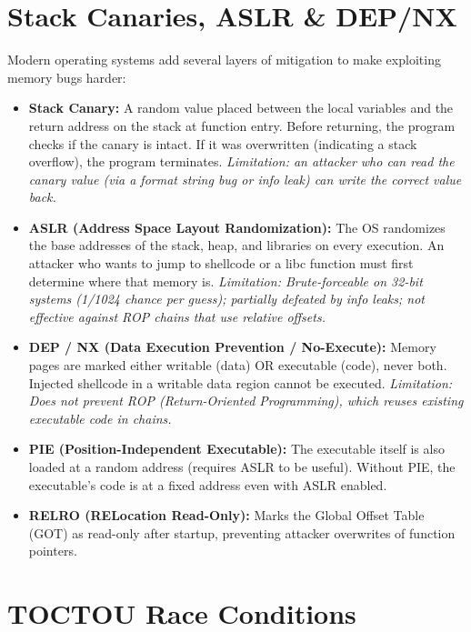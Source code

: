 \documentclass[11pt, letterpaper]{article}
\begin{document}
\section*{Stack Canaries, ASLR \& DEP/NX}

Modern operating systems add several layers of mitigation to make exploiting memory bugs harder:

\begin{itemize}[noitemsep]
  \item \textbf{Stack Canary:} A random value placed between the local variables and the return address on the stack at function entry. Before returning, the program checks if the canary is intact. If it was overwritten (indicating a stack overflow), the program terminates. \textit{Limitation: an attacker who can read the canary value (via a format string bug or info leak) can write the correct value back.}

  \item \textbf{ASLR (Address Space Layout Randomization):} The OS randomizes the base addresses of the stack, heap, and libraries on every execution. An attacker who wants to jump to shellcode or a libc function must first determine where that memory is. \textit{Limitation: Brute-forceable on 32-bit systems (1/1024 chance per guess); partially defeated by info leaks; not effective against ROP chains that use relative offsets.}

  \item \textbf{DEP / NX (Data Execution Prevention / No-Execute):} Memory pages are marked either writable (data) OR executable (code), never both. Injected shellcode in a writable data region cannot be executed. \textit{Limitation: Does not prevent ROP (Return-Oriented Programming), which reuses existing executable code in chains.}

  \item \textbf{PIE (Position-Independent Executable):} The executable itself is also loaded at a random address (requires ASLR to be useful). Without PIE, the executable's code is at a fixed address even with ASLR enabled.

  \item \textbf{RELRO (RELocation Read-Only):} Marks the Global Offset Table (GOT) as read-only after startup, preventing attacker overwrites of function pointers.
\end{itemize}

\section*{TOCTOU Race Conditions}
\end{document}
